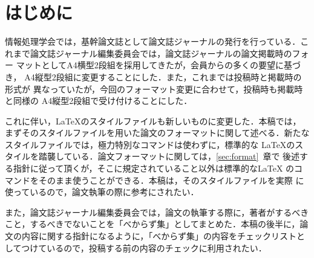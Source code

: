 \section{はじめに}

情報処理学会では，基幹論文誌として論文誌ジャーナルの発行を行っている．こ
れまで論文誌ジャーナル編集委員会では，論文誌ジャーナルの論文掲載時のフォー
マットとしてA4横型2段組を採用してきたが，会員からの多くの要望に基づき，
A4縦型2段組に変更することにした．また，これまでは投稿時と掲載時の形式が
異なっていたが，今回のフォーマット変更に合わせて，投稿時も掲載時と同様の
A4縦型2段組で受け付けることにした．


これに伴い，\LaTeX のスタイルファイルも新しいものに変更した．本稿では，
まずそのスタイルファイルを用いた論文のフォーマットに関して述べる．新たな
スタイルファイルでは，極力特別なコマンドは使わずに，標準的な \LaTeX のス
タイルを踏襲している．論文フォーマットに関しては，\ref{sec:format}~章で
後述する指針に従って頂くが，そこに規定されていること以外は標準的な\LaTeX
のコマンドをそのまま使うことができる．本稿は，そのスタイルファイルを実際
に使っているので，論文執筆の際に参考にされたい．



また，論文誌ジャーナル編集委員会では，論文の執筆する際に，著者がするべき
こと，するべきでないことを「べからず集」としてまとめた．本稿の後半に，論
文の内容に関する指針になるように，「べからず集」の内容をチェックリストと
してつけているので，投稿する前の内容のチェックに利用されたい．
